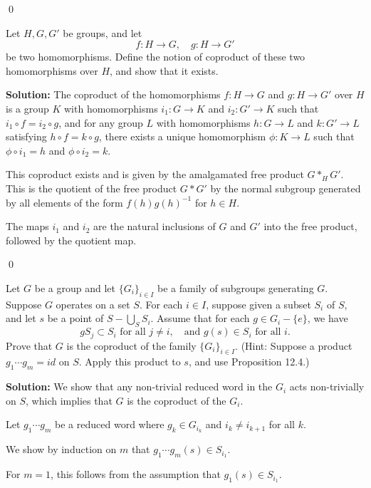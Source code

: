 \qed
\begin{problembox}
Let $H, G, G'$ be groups, and let
\[f: H \rightarrow G, \quad g: H \rightarrow G'\]
be two homomorphisms. Define the notion of coproduct of these two homomorphisms over $H$, and show that it exists.
\end{problembox}

\noindent\textbf{Solution:} The coproduct of the homomorphisms $f: H \to G$ and $g: H \to G'$ over $H$ is a group $K$ with homomorphisms $i_1: G \to K$ and $i_2: G' \to K$ such that $i_1 \circ f = i_2 \circ g$, and for any group $L$ with homomorphisms $h: G \to L$ and $k: G' \to L$ satisfying $h \circ f = k \circ g$, there exists a unique homomorphism $\phi: K \to L$ such that $\phi \circ i_1 = h$ and $\phi \circ i_2 = k$.

This coproduct exists and is given by the amalgamated free product $G *_H G'$. This is the quotient of the free product $G * G'$ by the normal subgroup generated by all elements of the form $f(h)g(h)^{-1}$ for $h \in H$.

The maps $i_1$ and $i_2$ are the natural inclusions of $G$ and $G'$ into the free product, followed by the quotient map.


\qed
\begin{problembox}
Let $G$ be a group and let $\{G_i\}_{i \in I}$ be a family of subgroups generating $G$. Suppose $G$ operates on a set $S$. For each $i \in I$, suppose given a subset $S_i$ of $S$, and let $s$ be a point of $S - \bigcup_S S_i$. Assume that for each $g \in G_i - \{e\}$, we have
\[gS_j \subset S_i \text{ for all } j \neq i, \quad \text{and } g(s) \in S_i \text{ for all } i.\]
Prove that $G$ is the coproduct of the family $\{G_i\}_{i \in I}$. (Hint: Suppose a product $g_1 \cdots g_m = id$ on $S$. Apply this product to $s$, and use Proposition 12.4.)
\end{problembox}

\noindent\textbf{Solution:} We show that any non-trivial reduced word in the $G_i$ acts non-trivially on $S$, which implies that $G$ is the coproduct of the $G_i$.

Let $g_1 \cdots g_m$ be a reduced word where $g_k \in G_{i_k}$ and $i_k \neq i_{k+1}$ for all $k$.

We show by induction on $m$ that $g_1 \cdots g_m(s) \in S_{i_1}$.

For $m = 1$, this follows from the assumption that $g_1(s) \in S_{i_1}$.

